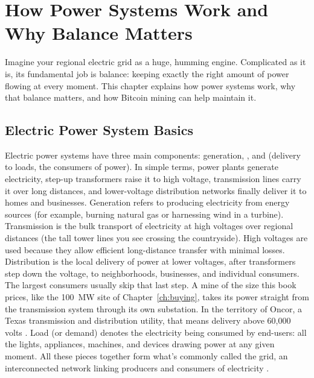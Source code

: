 \chapter{How Power Systems Work and Why Balance Matters}

Imagine your regional electric grid as a huge, humming engine. Complicated as it is, its fundamental job is balance: keeping exactly the right amount of power flowing at every moment. This chapter explains how power systems work, why that balance matters, and how Bitcoin mining can help maintain it.

\section{Electric Power System Basics}

Electric power systems have three main components: generation, , and  (delivery to loads, the consumers of power). In simple terms, power plants generate electricity, step-up transformers raise it to high voltage, transmission lines carry it over long distances, and lower-voltage distribution networks finally deliver it to homes and businesses. Generation refers to producing electricity from energy sources (for example, burning natural gas or harnessing wind in a turbine). Transmission is the bulk transport of electricity at high voltages over regional distances (the tall tower lines you see crossing the countryside). High voltages are used because they allow efficient long-distance transfer with minimal losses. Distribution is the local delivery of power at lower voltages, after transformers step down the voltage, to neighborhoods, businesses, and individual consumers.
The largest consumers usually skip that last step. A mine of the size this book prices, like the 100~MW site of Chapter~\ref{ch:buying}, takes its power straight from the transmission system through its own substation. In the territory of Oncor, a Texas transmission and distribution utility, that means delivery above 60,000 volts \autocite{oncor2026retailtariff}. %
Load (or demand) denotes the electricity being consumed by end-users: all the lights, appliances, machines, and devices drawing power at any given moment. All these pieces together form what's commonly called the grid, an interconnected network linking producers and consumers of electricity \autocite{EIAElectricDelivery}.

